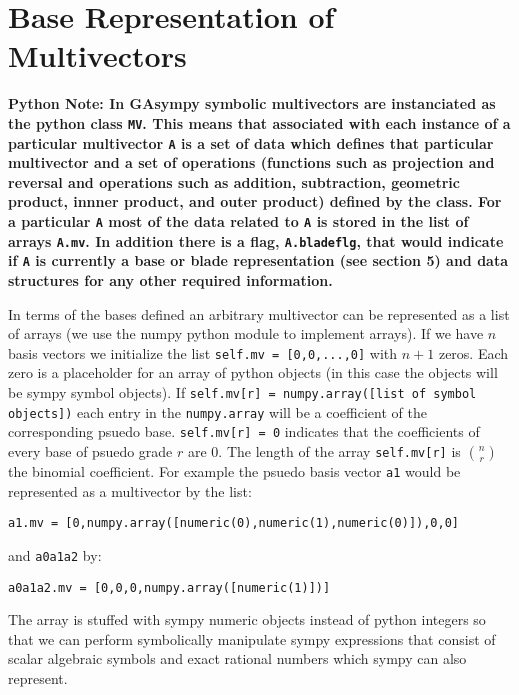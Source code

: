 \documentclass{article}
\begin{document}
\section{Base Representation of Multivectors}

{\bf Python Note: In GAsympy symbolic multivectors are instanciated as the python class {\tt MV}. This means that 
associated with each instance of a particular multivector {\tt A} is a set of data which defines that particular
multivector and a set of operations (functions such as projection and reversal and operations such as addition, 
subtraction, geometric product, innner product, and outer product) defined by the class. For a particular {\tt A} most of
the data related to {\tt A} is stored in the list of arrays {\tt A.mv}. In addition there is a flag, {\tt A.bladeflg},
that would indicate if {\tt A} is currently a base or blade representation (see section 5) and data structures 
for any other required information.}

In terms of the bases defined an arbitrary multivector can be represented as a list of arrays 
(we use the numpy python module to implement arrays).  
If we have $n$ basis vectors we initialize the list {\tt self.mv = [0,0,...,0]} with $n+1$ zeros.  Each zero is a
placeholder for an array of python objects (in this case the objects will be sympy 
symbol objects). If {\tt self.mv[r] = numpy.array([list of symbol objects])} each entry in the {\tt numpy.array}
will be a coefficient of the corresponding psuedo base. {\tt self.mv[r] = 0} indicates that the coefficients of every
base of psuedo grade $r$ are 0.  The length of the array {\tt self.mv[r]} is $n \choose r$ the
binomial coefficient. For example the psuedo basis vector {\tt a1} would be represented as a multivector by the list:

{\tt a1.mv = [0,numpy.array([numeric(0),numeric(1),numeric(0)]),0,0]}

and {\tt a0a1a2} by:

{\tt a0a1a2.mv = [0,0,0,numpy.array([numeric(1)])]}

The array is stuffed with sympy numeric objects instead of python integers so that we can perform symbolically manipulate
sympy expressions that consist of scalar algebraic symbols and exact rational numbers which sympy can also represent.
\end{document}
